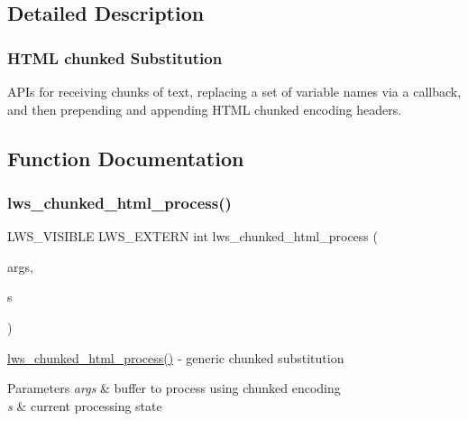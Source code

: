 \subsection{Detailed Description}
\subsubsection*{H\+T\+ML chunked Substitution}

A\+P\+Is for receiving chunks of text, replacing a set of variable names via a callback, and then prepending and appending H\+T\+ML chunked encoding headers. 

\subsection{Function Documentation}
\mbox{\label{group__html-chunked-substitution_ga643073f918c0a7016b690aae9793fd60}} 
\subsubsection{\texorpdfstring{lws\+\_\+chunked\+\_\+html\+\_\+process()}{lws\_chunked\_html\_process()}}
{\footnotesize\ttfamily L\+W\+S\+\_\+\+V\+I\+S\+I\+B\+LE L\+W\+S\+\_\+\+E\+X\+T\+E\+RN int lws\+\_\+chunked\+\_\+html\+\_\+process (\begin{DoxyParamCaption}\item[{struct \hyperlink{structlws__process__html__args}{lws\+\_\+process\+\_\+html\+\_\+args} $\ast$}]{args,  }\item[{struct \hyperlink{structlws__process__html__state}{lws\+\_\+process\+\_\+html\+\_\+state} $\ast$}]{s }\end{DoxyParamCaption})}

\hyperlink{group__html-chunked-substitution_ga643073f918c0a7016b690aae9793fd60}{lws\+\_\+chunked\+\_\+html\+\_\+process()} -\/ generic chunked substitution 
\begin{DoxyParams}{Parameters}
{\em args} & buffer to process using chunked encoding \\
\hline
{\em s} & current processing state \\
\hline
\end{DoxyParams}
